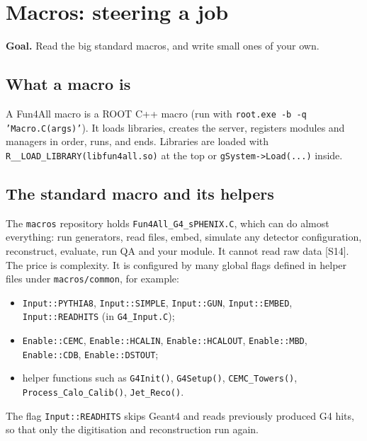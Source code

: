 \documentclass[11pt,letterpaper]{article}
\newcommand{\goal}[1]{\par\noindent\textbf{Goal.} #1\par}
\begin{document}
\section{Macros: steering a job}
\goal{Read the big standard macros, and write small ones of your own.}

\subsection{What a macro is}
A Fun4All macro is a ROOT C++ macro (run with \texttt{root.exe -b -q 'Macro.C(args)'}). It loads libraries, creates the server,
registers modules and managers in order, runs, and ends. Libraries are loaded with \texttt{R\_\_LOAD\_LIBRARY(libfun4all.so)} at the top or \texttt{gSystem->Load(...)} inside.

\subsection{The standard macro and its helpers}
The \texttt{macros} repository holds \texttt{Fun4All\_G4\_sPHENIX.C}, which can do almost everything: run generators, read files, embed,
simulate any detector configuration, reconstruct, evaluate, run QA and your module. It cannot read raw data [S14].
The price is complexity. It is configured by many global flags defined in helper files under \texttt{macros/common}, for example:
\begin{itemize}
\item \texttt{Input::PYTHIA8}, \texttt{Input::SIMPLE}, \texttt{Input::GUN}, \texttt{Input::EMBED}, \texttt{Input::READHITS} (in \texttt{G4\_Input.C});
\item \texttt{Enable::CEMC}, \texttt{Enable::HCALIN}, \texttt{Enable::HCALOUT}, \texttt{Enable::MBD}, \texttt{Enable::CDB}, \texttt{Enable::DSTOUT};
\item helper functions such as \texttt{G4Init()}, \texttt{G4Setup()}, \texttt{CEMC\_Towers()}, \texttt{Process\_Calo\_Calib()}, \texttt{Jet\_Reco()}.
\end{itemize}
The flag \texttt{Input::READHITS} skips Geant4 and reads previously produced G4 hits, so that only the digitisation and reconstruction run again.
\end{document}
